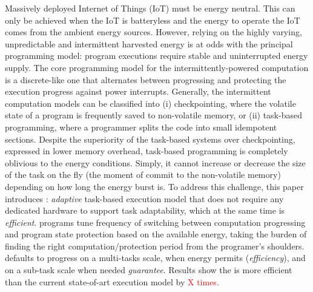 Massively deployed Internet of Things (IoT) must be energy neutral. This can only be achieved when the IoT is batteryless and the energy to operate the IoT comes from the ambient energy sources.
However, relying on the highly varying, unpredictable and intermittent harvested energy is at odds with the principal programming model: program executions require stable and uninterrupted energy supply. 
The core programming model for the intermittently-powered computation is a discrete-like one that alternates between progressing and protecting the execution progress against power interrupts.
Generally, the intermittent computation models can be classified into (i) checkpointing, where the volatile state of a program is frequently saved to non-volatile memory, or (ii) task-based programming, where a programmer splits the code into small idempotent sections. Despite the superiority of the task-based systems over checkpointing, expressed in lower memory overhead, task-based programming is completely oblivious to the energy conditions. Simply, it cannot increase or decrease the size of the task on the fly (the moment of commit to the non-volatile memory) depending on how long the energy burst is. 
To address this challenge, this paper introduces \sys: \emph{adaptive} task-based execution model that does not require any dedicated hardware to support task adaptability, which at the same time is \emph{efficient}.
\sys programs tune frequency of switching between computation progressing and program state protection based on the available energy, taking the burden of finding the right computation/protection period from the programer's shoulders.
\sys defaults to progress on a multi-tasks scale, when energy permits (\emph{efficiency}), and on a sub-task scale when needed {\emph{guarantee}}. 
Results show the \sys is more efficient than the current state-of-art execution model by \textcolor{red}{X times}.

